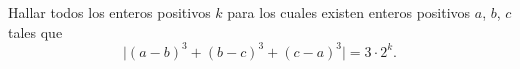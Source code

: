 Hallar todos los enteros positivos $k$ para los cuales existen enteros positivos $a$, $b$, $c$ tales que 
\[\lvert (a-b)^3+(b-c)^3+(c-a)^3\rvert=3\cdot2^k.\]
